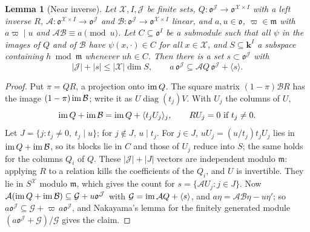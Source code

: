 \documentclass[10pt]{amsart}
\newtheorem{lemma}[theorem]{Lemma}
\theoremstyle{definition}
\theoremstyle{remark}
\providecommand{\pam}{\mathfrak m}
\providecommand{\pao}{\mathfrak o}
\providecommand{\phk}{\boldsymbol k}
\begin{document}
\begin{lemma}[Near inverse]\label{ph:near}
Let $\mathcal X,I,\mathcal J$ be finite sets, $Q\colon\pao^{\mathcal J}\to\pao^{\mathcal X\times
I}$ with a left inverse $R$, $\mathcal A\colon\pao^{\mathcal X\times I}\to\pao^{\mathcal J}$ and
$\mathcal B\colon\pao^{\mathcal J}\to\pao^{\mathcal X\times I}$ linear, and $a,u\in\pao$,
$\varpi\in\pam$ with $a\varpi\mid u$ and $\mathcal A\mathcal B\equiv a\pmod u$. Let
$C\subseteq\pao^I$ be a submodule such that all $\psi$ in the images of $Q$ and of $\mathcal B$
have $\psi(x,\cdot)\in C$ for all $x\in\mathcal X$, and $S\subseteq\phk^I$ a subspace containing
$h\bmod\pam$ whenever $uh\in C$. Then there is a set $s\subset\pao^{\mathcal J}$ with
\[
|\mathcal J|+|s|\le|\mathcal X|\dim S,\qquad a\,\pao^{\mathcal J}\subseteq\mathcal AQ\,
\pao^{\mathcal J}+\langle s\rangle .
\]
\end{lemma}
\begin{proof}
Put $\pi=QR$, a projection onto $\operatorname{im} Q$. The square matrix $(1-\pi)\mathcal BR$ has the image
$(1-\pi)\operatorname{im}\mathcal B$; write it as $U\operatorname{diag}(t_j)V$. With $U_j$ the columns of $U$,
\[
\operatorname{im} Q+\operatorname{im}\mathcal B=\operatorname{im} Q+\langle t_jU_j\rangle_j,\qquad RU_j=0\ \text{if }t_j\ne0 .
\]
Let $J=\{j:t_j\ne0,\ t_j\mid u\}$; for $j\notin J$, $u\mid t_j$. For $j\in J$, $uU_j=(u/t_j)t_jU_j$
lies in $\operatorname{im} Q+\operatorname{im}\mathcal B$, so its blocks lie in $C$ and those of $U_j$ reduce into $S$; the
same holds for the columns $Q_i$ of $Q$. These $|\mathcal J|+|J|$ vectors are independent modulo
$\pam$: applying $R$ to a relation kills the coefficients of the $Q_i$, and $U$ is invertible. They
lie in $S^{\mathcal X}$ modulo $\pam$, which gives the count for $s=\{\mathcal AU_j:j\in J\}$. Now
$\mathcal A(\phim Q+\phim\mathcal B)\subseteq\mathcal G+u\pao^{\mathcal J}$ with $\mathcal
G=\operatorname{im}\mathcal AQ+\langle s\rangle$, and $a\eta=\mathcal A\mathcal B\eta-u\eta'$; so
$a\pao^{\mathcal J}\subseteq\mathcal G+\varpi\,a\pao^{\mathcal J}$, and Nakayama's lemma for the
finitely generated module $(a\pao^{\mathcal J}+\mathcal G)/\mathcal G$ gives the claim.
\end{proof}
\end{document}
